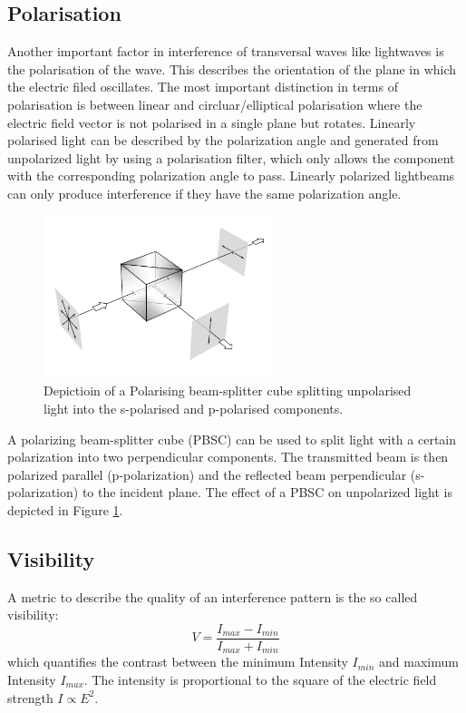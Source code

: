 \subsection{Polarisation}
Another important factor in interference of transversal waves like lightwaves is the polarisation of the wave. This describes the orientation of the plane in which the electric filed oscillates. The most important distinction in terms of polarisation is between linear and circluar/elliptical polarisation where the electric field vector is not polarised in a single plane but rotates. Linearly polarised light can be described by the polarization angle and generated from unpolarized light by using a polarisation filter, which only allows the component with the corresponding polarization angle to pass. Linearly polarized lightbeams can only produce interference if they have the same polarization angle. 
\begin{figure}
\centering
\includegraphics[width=0.6\textwidth]{PBSC}
\caption{Depictioin of a Polarising beam-splitter cube splitting unpolarised light into the s-polarised and p-polarised components. \cite{Hecht_2018}}
\label{fig:PBSC}
\end{figure}
A polarizing beam-splitter cube (PBSC) can be used to split light with a certain polarization into two perpendicular components. The transmitted beam is then polarized parallel (p-polarization) and the reflected beam perpendicular (s-polarization) to the incident plane. The effect of a PBSC on unpolarized light is depicted in Figure \ref{fig:PBSC}.
\subsection{Visibility}
A metric to describe the quality of an interference pattern is the so called visibility:
\begin{equation}
V=\frac{I_{max}-I_{min}}{I_{max}+I_{min}}
\end{equation}
which quantifies the contrast between the minimum Intensity $I_{min}$ and maximum Intensity $I_{max}$. The intensity is proportional to the square of the electric field strength $I\propto E^2$. 

